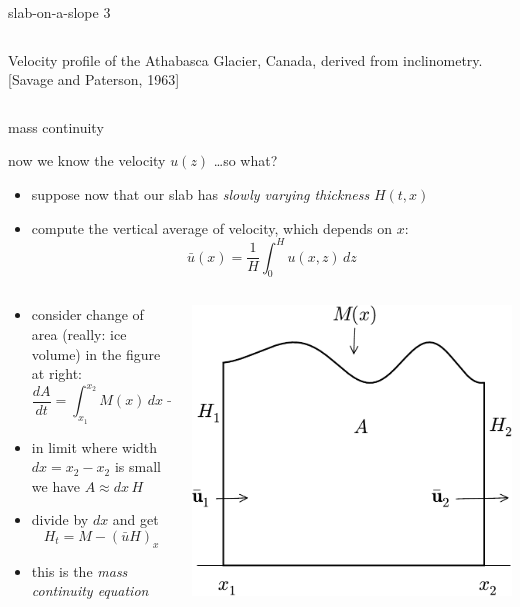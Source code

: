 \begin{frame}{slab-on-a-slope 3}
\begin{columns}
\begin{column}{0.4\textwidth}
\medskip
\scriptsize
Velocity profile of the Athabasca Glacier, Canada, derived from inclinometry.  [Savage and Paterson, 1963]\nocite{SavagePaterson}
\end{column}
\end{columns}
\end{frame}


\begin{frame}{mass continuity}

\small
now we know the velocity $u(z)$ \dots so what?
\begin{itemize}
\item suppose now that our slab has \emph{slowly varying thickness} $H(t,x)$
\item compute the vertical average of velocity, which depends on $x$:
	$$\bar u(x) = \frac{1}{H}\int_0^{H} u(x,z)\,dz$$
\end{itemize}

\begin{columns}
\begin{column}{0.6\textwidth}
\begin{itemize}
\item consider change of area (really: ice volume) in the figure at right:
	$$\frac{dA}{dt} = \int_{x_1}^{x_2} M(x)\,dx + \bar u_1 H_1 - \bar u_2 H_2$$
\item in limit where width $dx=x_2-x_2$ is small we have $A\approx dx\, H$
\item divide by $dx$ and get
   $$H_t = M - \left(\bar u H\right)_x$$
\item this is the \emph{mass continuity equation}
\end{itemize}
\end{column}
\begin{column}{0.4\textwidth}
\includegraphics[width=1.0\textwidth]{photos/slabmasscontfig}
\end{column}
\end{columns}
\end{frame}


